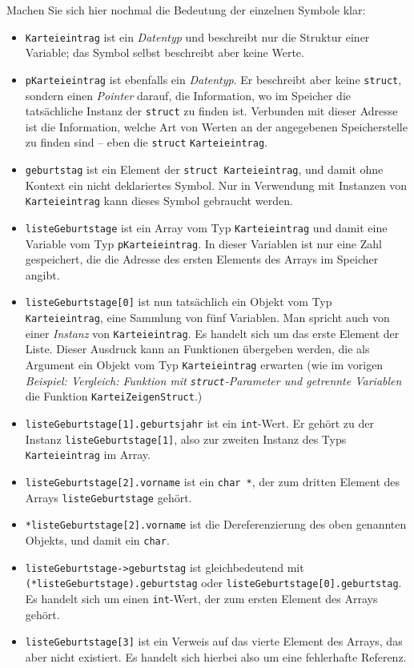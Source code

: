 Machen Sie sich hier nochmal die Bedeutung der einzelnen Symbole klar:
\begin{itemize}
\item \texttt{Karteieintrag} ist ein \emph{Datentyp} und beschreibt nur die Struktur einer Variable; das
	Symbol selbst beschreibt aber keine Werte.
\item \texttt{pKarteieintrag} ist ebenfalls ein \emph{Datentyp}. Er beschreibt aber keine 
	\texttt{struct}, sondern einen \emph{Pointer} darauf, \ie die Information, wo im Speicher die
	tatsächliche Instanz der \texttt{struct} zu finden ist. Verbunden mit dieser Adresse ist die
	Information,  welche Art von Werten an der angegebenen Speicherstelle zu finden sind -- eben die 
	\texttt{struct} \texttt{Karteieintrag}.
\item \texttt{geburtstag} ist ein Element der \texttt{struct Karteieintrag}, und damit ohne
	Kontext ein nicht deklariertes Symbol. Nur in Verwendung mit Instanzen von \texttt{Karteieintrag}
	kann dieses Symbol gebraucht werden.
\item \texttt{listeGeburtstage} ist ein Array vom Typ \texttt{Karteieintrag} und damit eine Variable vom
	Typ \texttt{pKarteieintrag}. In dieser Variablen ist nur eine Zahl gespeichert, die die Adresse des 
	ersten Elements des Arrays im Speicher angibt.
\item \texttt{listeGeburtstage[0]} ist nun tatsächlich ein Objekt vom Typ \texttt{Karteieintrag}, \ie
	eine Sammlung von fünf Variablen. Man spricht auch von einer \emph{Instanz} von
	\texttt{Karteieintrag}. Es handelt sich um das erste Element der Liste. Dieser Ausdruck kann \eg an
	Funktionen übergeben werden, die als Argument ein Objekt vom Typ \texttt{Karteieintrag} erwarten 
	(wie im vorigen \emph{Beispiel: Vergleich: Funktion mit \texttt{struct}-Parameter und getrennte
	 Variablen} die Funktion \texttt{KarteiZeigenStruct}.)
\item \texttt{listeGeburtstage[1].geburtsjahr} ist ein \texttt{int}-Wert. Er gehört zu der
	Instanz 	\texttt{listeGeburtstage[1]}, also zur zweiten Instanz des Typs \texttt{Karteieintrag} im
	Array.
\item \texttt{listeGeburtstage[2].vorname} ist ein \texttt{char *}, der zum dritten Element des Arrays
	\texttt{listeGeburtstage} gehört.
\item \texttt{*listeGeburtstage[2].vorname} ist die Dereferenzierung des oben genannten Objekts, und
	damit ein \texttt{char}.
\item \texttt{listeGeburtstage->geburtstag} ist gleichbedeutend mit
	\texttt{(*listeGeburtstage).geburtstag} oder \texttt{listeGeburtstage[0].geburtstag}. Es handelt
	sich um einen \texttt{int}-Wert, der zum ersten Element des Arrays gehört.
\item \texttt{listeGeburtstage[3]} ist ein Verweis auf das vierte Element des Arrays, das aber nicht
	existiert. Es handelt sich hierbei also um eine fehlerhafte Referenz.
\end{itemize}

